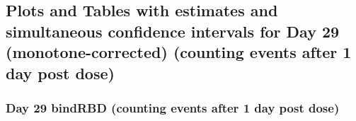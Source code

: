 \documentclass[]{article}
\begin{document}
\clearpage
\clearpage

\hypertarget{plots-and-tables-with-estimates-and-simultaneous-confidence-intervals-for-day-29-monotone-corrected-counting-events-after-1-day-post-dose-1}{%
\subsection{Plots and Tables with estimates and simultaneous confidence
intervals for Day 29 (monotone-corrected) (counting events after 1 day
post
dose)}\label{plots-and-tables-with-estimates-and-simultaneous-confidence-intervals-for-day-29-monotone-corrected-counting-events-after-1-day-post-dose-1}}

\clearpage

\hypertarget{day-29-bindrbd-counting-events-after-1-day-post-dose-3}{%
\subsubsection{Day 29 bindRBD (counting events after 1 day post
dose)}\label{day-29-bindrbd-counting-events-after-1-day-post-dose-3}}
\end{document}
